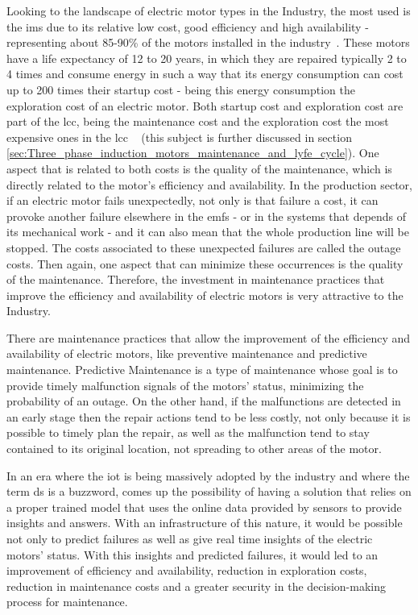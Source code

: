 Looking to the landscape of electric motor types in the Industry, the most used is the \acrfull{ims} due to its relative low cost, good efficiency and high availability - representing about 85-90\% of the motors installed in the industry~\cite{Ferreira1}. 
These motors have a life expectancy of 12 to 20 years, in which they are repaired typically 2 to 4 times and consume energy in such a way that its energy consumption can cost up to 200 times their startup cost - being this energy consumption the exploration cost of an electric motor. 
Both startup cost and exploration cost are part of the \acrfull{lcc}, being the maintenance cost and the exploration cost the most expensive ones in the \acrshort{lcc} ~\cite{Ferreira1} (this subject is further discussed in section \ref{sec:Three_phase_induction_motors_maintenance_and_lyfe_cycle}). One aspect that is related to both costs is the quality of the maintenance, which is directly related to the motor's efficiency and availability. 
In the production sector, if an electric motor fails unexpectedly, not only is that failure a cost, it can provoke another failure elsewhere in the  \acrshort{emfs} - or in the systems that depends of its mechanical work - and it can also mean that the whole production line will be stopped. The costs associated to these unexpected failures are called the outage costs. Then again, one aspect that can minimize these occurrences is the quality of the maintenance. Therefore, the investment in maintenance practices that improve the efficiency and availability of electric motors is very attractive to the Industry.

There are maintenance practices that allow the improvement of the efficiency and availability of electric motors, like preventive maintenance and predictive maintenance. 
Predictive Maintenance is a type of maintenance whose goal is to provide timely malfunction signals of the motors' status, minimizing the probability of an outage.  
On the other hand, if the malfunctions are detected in an early stage then the repair actions tend to be less costly, not only because it is possible to timely plan the repair, as well as the malfunction tend to stay contained to its original location, not spreading to other areas of the motor.

In an era where the \acrfull{iot} is being massively adopted by the industry and where the term \acrfull{ds} is a buzzword, comes up the possibility of having a solution that relies on a proper trained model that uses the online data provided by sensors to provide insights and answers. 
With an infrastructure of this nature, it would be possible not only to predict failures as well as give real time insights of the electric motors' status. With this insights and predicted failures, it would led to an improvement of efficiency and availability, reduction in exploration costs, reduction in maintenance costs and a greater security in the decision-making process for maintenance.

